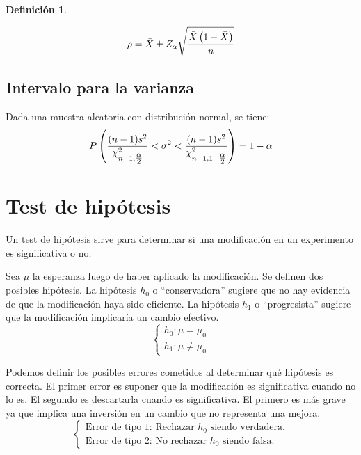 \documentclass[a5paper,12pt,twoside]{book}
\newtheorem{defn}{{Definición}}[chapter]
\begin{document}
\begin{mdframed}[style=DefinitionFrame]
    \begin{defn}
    \end{defn}
    \begin{equation*}
        \rho = \bar{X} \pm Z_\alpha \sqrt{\frac{\bar{X} \left(1-\bar{X}\right)}{n}}
    \end{equation*}
\end{mdframed}


\subsection{Intervalo para la varianza}

Dada una muestra aleatoria con distribución normal, se tiene:
\begin{equation*}
    P \left(\frac{(n-1)s^2}{\chi_{n-1,\tfrac{\alpha}{2}}^2} < \sigma^2 < \frac{(n-1)s^2}{\chi_{n-1,1-\tfrac{\alpha}{2}}^2} \right) = 1 - \alpha
\end{equation*}


\section{Test de hipótesis}

Un test de hipótesis sirve para determinar si una modificación en un experimento es significativa o no.

Sea $\mu$ la esperanza luego de haber aplicado la modificación.
Se definen dos posibles hipótesis.
La hipótesis $h_0$ o ``conservadora'' sugiere que no hay evidencia de que la modificación haya sido eficiente.
La hipótesis $h_1$ o ``progresista'' sugiere que la modificación implicaría un cambio efectivo.
\begin{equation*}
    \left\{
    \begin{aligned}
        h_0: \mu = \mu_0
        \\
        h_1: \mu \neq \mu_0
    \end{aligned}
    \right.
\end{equation*}

Podemos definir los posibles errores cometidos al determinar qué hipótesis es correcta.
El primer error es suponer que la modificación es significativa cuando no lo es.
El segundo es descartarla cuando es significativa.
El primero es más grave ya que implica una inversión en un cambio que no representa una mejora.
\begin{equation*}
    \left\{
    \begin{aligned}
        \text{Error de tipo 1: Rechazar $h_0$ siendo verdadera.}
        \\
        \text{Error de tipo 2: No rechazar $h_0$ siendo falsa.}
    \end{aligned}
    \right.
\end{equation*}
\end{document}
